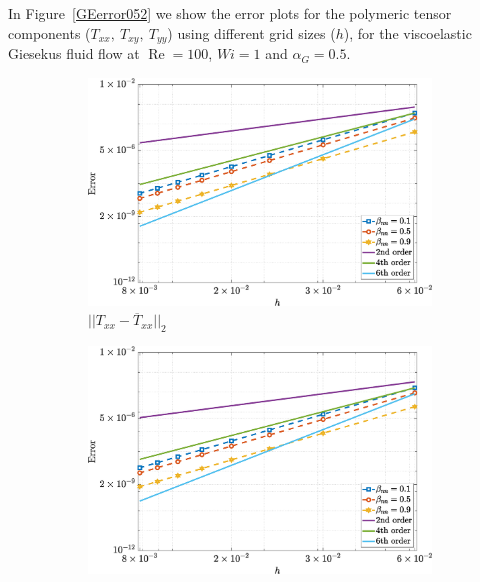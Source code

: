 \documentclass[preprint, 12pt]{elsarticle}
\begin{document}
In Figure~\ref{GEerror052} we show the error plots for the polymeric tensor components ($T_{xx},~T_{xy},~T_{yy}$) using different grid sizes ($h$), for the viscoelastic Giesekus fluid flow at $\operatorname{Re}=100$, $Wi=1$ and $\alpha_G=0.5$.
\begin{figure}[H]
    \centering  
    \begin{subfigure}[b]{.46\textwidth}
        \includegraphics[width=\textwidth]{NormErr_2nd_Re_100_Wi_1_epsilon_0_xi_0_alphaG_0.5_Dt_1e-06_at_0.05_tipsim_1_MMS_12_Txx.eps}
        \caption{$||T_{xx} - \overline{T}_{xx}||_{2}$}
        \label{error_txx_2nd_Case1_giesekus_alphaG_0.5}
    \end{subfigure}
    \vspace{0.2cm}
    \qquad
    \begin{subfigure}[b]{.46\textwidth}
        \includegraphics[width=\textwidth]{NormErr_2nd_Re_100_Wi_1_epsilon_0_xi_0_alphaG_0.5_Dt_1e-06_at_0.05_tipsim_1_MMS_12_Txy.eps}

\end{subfigure}
\end{figure}
\end{document}
